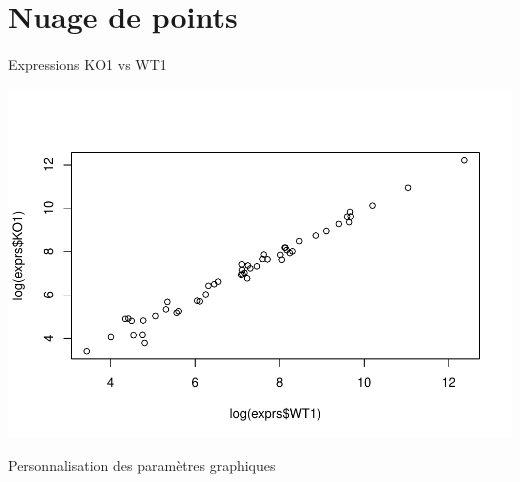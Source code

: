 \documentclass[
]{book}
\newenvironment{Shaded}{\begin{snugshade}}{\end{snugshade}}
\newcommand{\AttributeTok}[1]{\textcolor[rgb]{0.77,0.63,0.00}{#1}}
\newcommand{\FunctionTok}[1]{\textcolor[rgb]{0.00,0.00,0.00}{#1}}
\newcommand{\NormalTok}[1]{#1}
\newcommand{\SpecialCharTok}[1]{\textcolor[rgb]{0.00,0.00,0.00}{#1}}
\begin{document}
\hypertarget{nuage-de-points}{%
\section{Nuage de points}\label{nuage-de-points}}

Expressions KO1 vs WT1

\begin{Shaded}
\end{Shaded}

\includegraphics{images/unnamed-chunk-86-1.pdf}

Personnalisation des paramètres graphiques
\end{document}
